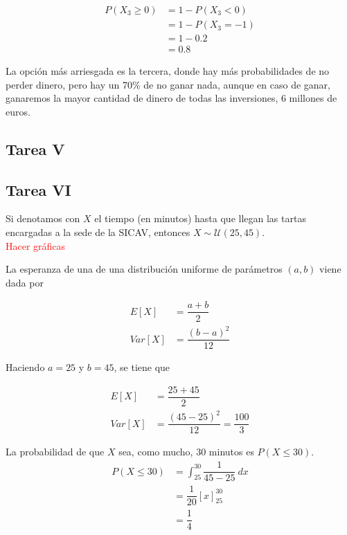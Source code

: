 \documentclass[12pt,a4paper,twoside,openright,titlepage,final]{article}
\begin{document}
\begin{align*}
P(X_3 \geq 0) & = 1 - P(X_3 < 0) \\ & = 1 - P(X_3 = -1) \\ & = 1 - 0.2 \\ & = 0.8 
\end{align*}

La opción más arriesgada es la tercera, donde hay más probabilidades de no perder dinero, pero hay un 70\% de no ganar nada, aunque en caso de ganar, ganaremos la mayor cantidad de dinero de todas las inversiones, 6 millones de euros.\\

 

\subsection{Tarea V}



\subsection{Tarea VI}

Si denotamos con $X$ el tiempo (en minutos) hasta que llegan las tartas encargadas a la sede de la SICAV, entonces $X \sim \mathcal{U}(25,45)$.\\

\textcolor{red}{Hacer gráficas}

La esperanza de una de una distribución uniforme de parámetros $(a, b)$ viene dada por

\begin{align*}
E[X] & = \dfrac{a + b}{2}\\
Var[X] & = \dfrac{(b-a)^2}{12}
\end{align*}

Haciendo $a = 25$ y $b = 45$, se tiene que

\begin{align*}
E[X] & = \dfrac{25+45}{2}\\
Var[X] & = \dfrac{(45-25)^2}{12} = \dfrac{100}{3}
\end{align*}

La probabilidad de que $X$ sea, como mucho, 30 minutos es $P(X \leq 30)$.\\

\begin{align*}
P(X \leq 30) & = \int_{25}^{30} \dfrac{1}{45 -25} \ dx \\
& = \dfrac{1}{20}\left[x\right]_{25}^{30} \\ & = \dfrac{1}{4}
\end{align*}
\end{document}
